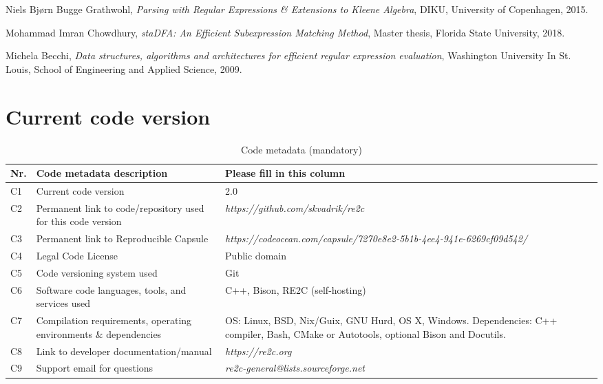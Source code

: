 \documentclass[preprint,12pt, a4paper]{elsarticle}
\begin{document}
\begin{thebibliography}{00}
    Niels Bj{\o}rn Bugge Grathwohl,
    \textit{Parsing with Regular Expressions \& Extensions to Kleene Algebra},
    DIKU, University of Copenhagen,
    2015.

    Mohammad Imran Chowdhury,
    \textit{staDFA: An Efficient Subexpression Matching Method},
    Master thesis,
    Florida State University,
    2018.

    Michela Becchi,
    \textit{Data structures, algorithms and architectures for efficient regular expression evaluation},
    Washington University In St. Louis, School of Engineering and Applied Science,
    2009.

\end{thebibliography}

\vfill\null
\clearpage

\section*{Current code version}
\label{}

\begin{table}[!h]
\begin{tabular}{|l|p{5.7cm}|p{7.3cm}|}
\hline
\textbf{Nr.} & \textbf{Code metadata description} & \textbf{Please fill in this column} \\
\hline
C1 & Current code version & 2.0 \\
\hline
C2 & Permanent link to code/repository used for this code version &
    \textit{https://github.com/skvadrik/re2c} \\
\hline
C3  & Permanent link to Reproducible Capsule &
    \textit{https://codeocean.com/capsule/7270e8e2-5b1b-4ee4-941e-6269cf09d542/} \\
\hline
C4 & Legal Code License   & Public domain \\
\hline
C5 & Code versioning system used & Git \\
\hline
C6 & Software code languages, tools, and services used & C++, Bison, RE2C (self-hosting) \\
\hline
C7 & Compilation requirements, operating environments \& dependencies &
    OS: Linux, BSD, Nix/Guix, GNU Hurd, OS X, Windows.
    Dependencies: C++ compiler, Bash, CMake or Autotools, optional Bison and Docutils. \\
\hline
C8 & Link to developer documentation/manual & \textit{https://re2c.org} \\
\hline
C9 & Support email for questions & \textit{re2c-general@lists.sourceforge.net} \\
\hline
\end{tabular}
\caption{Code metadata (mandatory)}
\label{} 
\end{table}
\end{document}
